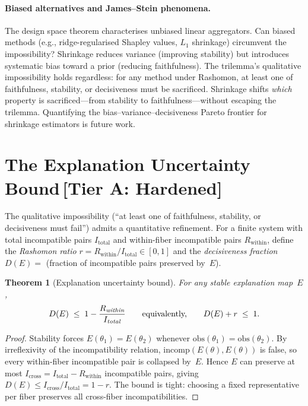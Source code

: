 \documentclass[11pt,a4paper]{article}
\newtheorem{theorem}{Theorem}[section]
\begin{document}
\paragraph{Biased alternatives and James--Stein phenomena.}
The design space theorem characterises unbiased linear aggregators. Can biased methods (e.g., ridge-regularised Shapley values, $L_1$ shrinkage) circumvent the impossibility? Shrinkage reduces variance (improving stability) but introduces systematic bias toward a prior (reducing faithfulness). The trilemma's qualitative impossibility holds regardless: for any method under Rashomon, at least one of faithfulness, stability, or decisiveness must be sacrificed. Shrinkage shifts \emph{which} property is sacrificed---from stability to faithfulness---without escaping the trilemma. Quantifying the bias--variance--decisiveness Pareto frontier for shrinkage estimators is future work.

\section{The Explanation Uncertainty Bound\,\textnormal{\normalsize[Tier A: Hardened]}}
\label{sec:bridge-uncertainty}

The qualitative impossibility (``at least one of faithfulness, stability, or
decisiveness must fail'') admits a quantitative refinement.  For a finite
system with total incompatible pairs $I_{\text{total}}$ and within-fiber
incompatible pairs $R_{\text{within}}$, define the \emph{Rashomon ratio}
$r = R_{\text{within}} / I_{\text{total}} \in [0,1]$ and the
\emph{decisiveness fraction} $D(E) = $ (fraction of incompatible pairs
preserved by~$E$).

\begin{theorem}[Explanation uncertainty bound]
\label{thm:uncertainty-principle}
For any stable explanation map~$E$,
\[
  D(E) \;\leq\; 1 - \frac{R_{\emph{within}}}{I_{\emph{total}}}
  \qquad\text{equivalently,}\qquad D(E) + r \;\leq\; 1.
\]
\end{theorem}

\begin{proof}
Stability forces $E(\theta_1) = E(\theta_2)$ whenever
$\mathrm{obs}(\theta_1) = \mathrm{obs}(\theta_2)$.  By irreflexivity of the
incompatibility relation, $\mathrm{incomp}(E(\theta), E(\theta))$ is false,
so every within-fiber incompatible pair is collapsed by~$E$.  Hence $E$ can
preserve at most $I_{\text{cross}} = I_{\text{total}} - R_{\text{within}}$
incompatible pairs, giving $D(E) \leq I_{\text{cross}} / I_{\text{total}} =
1 - r$.  The bound is tight: choosing a fixed representative per fiber
preserves all cross-fiber incompatibilities.
\end{proof}
\end{document}
